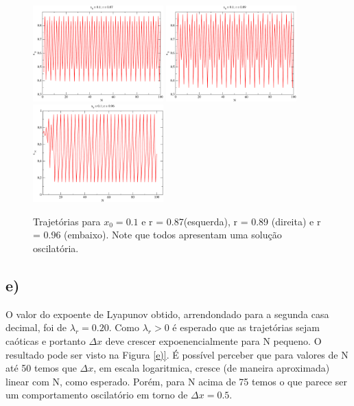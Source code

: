 \documentclass[a4wide]{report}
\begin{document}
\begin{figure}[!htb]
\centering
\includegraphics[width=0.447\textwidth]{087.pdf}
\includegraphics[width=0.447\textwidth]{089.pdf}
\includegraphics[width=0.447\textwidth]{096.pdf}
\caption{Trajetórias para $x_0 = 0.1$ e r = 0.87(esquerda), r = 0.89 (direita) e r = 0.96 (embaixo). Note que todos apresentam uma solução oscilatória.}
\label{solucao}
\end{figure}


\subsection*{e)}
O valor do expoente de Lyapunov obtido, arrendondado para a segunda casa decimal, foi de $\lambda_{r} = 0.20$. Como  $\lambda_{r} > 0 $ é esperado que as trajetórias sejam caóticas e portanto $\Delta x$ deve crescer expoenencialmente para N pequeno. O resultado pode ser visto na Figura \ref{e)}. É possível perceber que para valores de N até 50 temos que $\Delta x$, em escala logaritmica, cresce (de maneira aproximada) linear com N, como esperado. Porém, para N acima de 75 temos o que parece ser um comportamento oscilatório em torno de $\Delta x = 0.5$.
\end{document}

